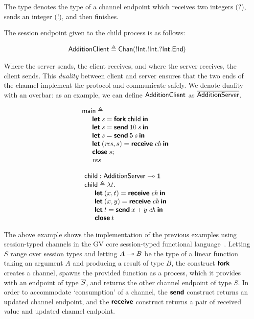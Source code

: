 \documentclass[
graybox,
envcountchap
]{svmult}
\begin{document}
\begin{bibunit}
  The  type denotes the type of a channel endpoint which
  receives two integers (?), sends an integer (!), and then finishes.

  The session endpoint given to the child process is as follows:

  \[
    \mathsf{AdditionClient} \triangleq
    \mathsf{Chan}({!}\mathsf{Int}.{!}\mathsf{Int}.{?}\mathsf{Int}.\mathsf{End})
  \]

  Where the server sends, the client receives, and where the server receives,
  the client sends. This \emph{duality} between client and server ensures that
  the two ends of the channel implement the protocol and communicate safely.
  We denote duality with an overbar: as an example, we can define
  $\mathsf{AdditionClient}$ as $\overline{\mathsf{AdditionServer}}$.

  \begin{minipage}[t]{0.45\textwidth}
  \[
    \begin{array}{l}
    \mathsf{main} \triangleq \\
    \quad
      \begin{array}{l}
        \textbf{\textsf{let}} \: \mathit{s} = \textbf{\textsf{fork}} \: \mathsf{child} \: \textbf{\textsf{in}} \\
        \textbf{\textsf{let}} \: \mathit{s} = \textbf{\textsf{send}} \: 10 \: \mathit{s} \: \textbf{\textsf{in}} \\
        \textbf{\textsf{let}} \: \mathit{s} = \textbf{\textsf{send}} \: 5 \: \mathit{s} \: \textbf{\textsf{in}} \\
        \textbf{\textsf{let}} \: (\mathit{res}, s) = \textbf{\textsf{receive}} \: \mathit{ch} \: \textbf{\textsf{in}} \\
        \textbf{\textsf{close}} \: s; \\
        \mathit{res}
      \end{array}
    \end{array}
  \]
\end{minipage}
\hfill
\begin{minipage}[t]{0.45\textwidth}
  \[
    \begin{array}{l}
    \mathsf{child} : \mathsf{AdditionServer} \multimap \mathbf{1} \\
    \mathsf{child} \triangleq \lambda t .\\
    \quad
      \begin{array}{l}
      \textbf{\textsf{let}} \: (x, t) = \textbf{\textsf{receive}} \: \mathit{ch} \: \textbf{\textsf{in}} \\
      \textbf{\textsf{let}} \: (x, y) = \textbf{\textsf{receive}} \: \mathit{ch} \: \textbf{\textsf{in}} \\
      \textbf{\textsf{let}} \: t = \textbf{\textsf{send}} \: x + y \: \mathit{ch} \: \textbf{\textsf{in}} \\
      \textbf{\textsf{close}} \: t
      \end{array}
    \end{array}
  \]
\end{minipage}

  The above example shows the implementation of the previous examples using
  session-typed channels in the GV core session-typed
  functional language~\cite{GayV10:last, Wadler14:prop-sessions,
  LindleyM15:semantics}. Letting $S$ range over session types and letting
  $A \multimap B$ be the type of a linear function taking an argument $A$ and
  producing a result of type $B$, the  construct $\textbf{\textsf{fork}}$
  creates a channel, spawns the provided function as a process, which it provides with an endpoint of
  type $\overline{S}$, and returns the other channel endpoint of type $S$.
  In order to accommodate `consumption' of a channel, the
  $\textbf{\textsf{send}}$ construct returns an updated channel endpoint, and the
  $\textbf{\textsf{receive}}$ construct returns a pair of received value and updated
  channel endpoint.


\end{bibunit}
\end{document}
